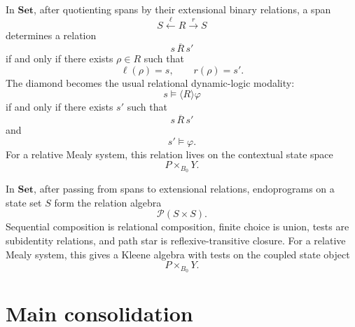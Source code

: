 \begin{example}
\label{ex:derived-relative-relational-pdl}
In \(\mathbf{Set}\), after quotienting spans by their extensional binary
relations, a span
\[
S\xleftarrow{\ell}R\xrightarrow{r}S
\]
determines a relation
\[
s\,\overline R\,s'
\]
if and only if there exists \(\rho\in R\) such that
\[
\ell(\rho)=s,
\qquad
r(\rho)=s'.
\]
The diamond becomes the usual relational dynamic-logic modality:
\[
s\models\langle R\rangle\varphi
\]
if and only if there exists \(s'\) such that
\[
s\,\overline R\,s'
\]
and
\[
s'\models\varphi.
\]
For a relative Mealy system, this relation lives on the contextual state space
\[
P\times_{B_0}Y.
\]
\end{example}

\begin{example}
\label{ex:derived-relative-relational-kat}
In \(\mathbf{Set}\), after passing from spans to extensional relations,
endoprograms on a state set \(S\) form the relation algebra
\[
\mathcal P(S\times S).
\]
Sequential composition is relational composition, finite choice is union,
tests are subidentity relations, and path star is reflexive-transitive
closure. For a relative Mealy system, this gives a Kleene algebra with tests
on the coupled state object
\[
P\times_{B_0}Y.
\]
\end{example}

\section{Main consolidation}
\label{sec:derived-relative-main-consolidation}

